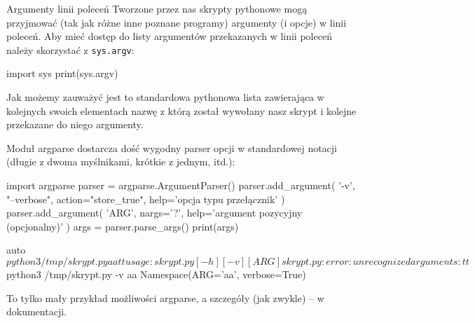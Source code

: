 % 
% 
% 
% 

\begin{ProTip}[breakable]{Argumenty linii poleceń }
Tworzone przez nas skrypty pythonowe mogą przyjmować (tak jak różne inne poznane programy) argumenty (i opcje) w linii poleceń.
Aby mieć dostęp do listy argumentów przekazanych w linii poleceń należy skorzystać z \Verb#sys.argv#:

\begin{CodeFrame}[python]{.5\textwidth}
import sys
print(sys.argv)
\end{CodeFrame}

Jak możemy zauważyć jest to standardowa pythonowa lista zawierająca w kolejnych swoich elementach nazwę z którą został wywołany nasz skrypt i kolejne przekazane do niego argumenty.

Moduł argparse dostarcza dość wygodny parser opcji w standardowej notacji (długie z dwoma myślnikami, krótkie z jednym, itd.):

\begin{CodeFrame}[python]{.5\textwidth}
import argparse
parser = argparse.ArgumentParser()
parser.add_argument(
  '-v', "--verbose", action="store_true",
  help='opcja typu przełącznik'
)
parser.add_argument(
  'ARG', nargs='?',
  help='argument pozycyjny (opcjonalny)'
)
args = parser.parse_args()
print(args)
\end{CodeFrame}
\begin{CodeFrame}{auto}
$ python3 /tmp/skrypt.py aa tt
usage: skrypt.py [-h] [-v] [ARG]
skrypt.py: error: unrecognized arguments: tt
$ python3 /tmp/skrypt.py -v aa
Namespace(ARG='aa', verbose=True)
\end{CodeFrame}

To tylko mały przykład możliwości argparse, a szczegóły (jak zwykle) – w dokumentacji.
\end{ProTip}
